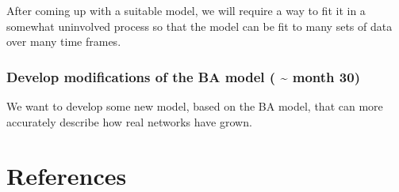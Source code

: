 \documentclass[
]{article}
\begin{document}
After coming up with a suitable model, we will require a way to fit it
in a somewhat uninvolved process so that the model can be fit to many
sets of data over many time frames.

\subsubsection*{Develop modifications of the BA model (
\textasciitilde{} month
30)}\label{develop-modifications-of-the-ba-model-month-30}

We want to develop some new model, based on the BA model, that can more
accurately describe how real networks have grown.

\newpage{}

\section*{References}\label{references}
\end{document}
